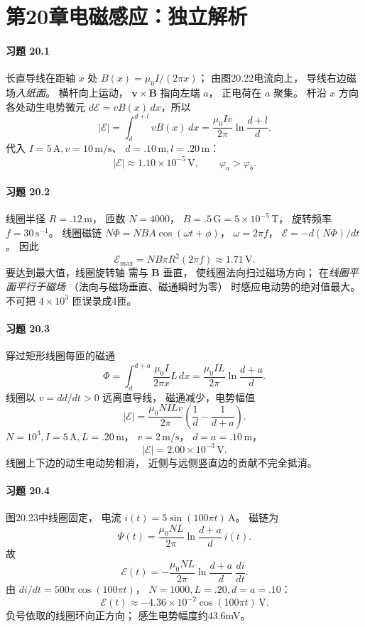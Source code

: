 \section*{第20章\quad 电磁感应：独立解析}

\paragraph{习题 20.1}
长直导线在距轴 \(x\) 处
\(B(x)=\mu_0I/(2\pi x)\)；
由图20.22电流向上，
导线右边磁场\emph{入纸面}。
横杆向上运动，
\(\boldsymbol v\times\boldsymbol B\) 指向左端 \(a\)，
正电荷在 \(a\) 聚集。
杆沿 \(x\) 方向各处动生电势微元
\(d\mathcal E=vB(x)\,dx\)，所以
\[
 \boxed{|\mathcal E|=\int_d^{d+l}vB(x)\,dx
 =\frac{\mu_0Iv}{2\pi}\ln\frac{d+l}{d}}.
\]
代入 \(I=5\,\mathrm A,v=10\,\mathrm{m/s}\)、
\(d=.10\,\mathrm m,l=.20\,\mathrm m\)：
\[
 \boxed{|\mathcal E|\approx1.10\times10^{-5}\,\mathrm V},
 \qquad \boxed{\varphi_a>\varphi_b}.
\]

\paragraph{习题 20.2}
线圈半径 \(R=.12\,\mathrm m\)，
匝数 \(N=4000\)，
\(B=.5\,\mathrm G=5\times10^{-5}\,\mathrm T\)，
旋转频率 \(f=30\,\mathrm{s^{-1}}\)。
线圈磁链 \(N\Phi=NBA\cos(\omega t+\phi)\)，
\(\omega=2\pi f\)，
\(\mathcal E=-d(N\Phi)/dt\)。
因此
\[
 \boxed{\mathcal E_{\max}=NB\pi R^2(2\pi f)
 \approx1.71\,\mathrm V}.
\]
要达到最大值，线圈旋转轴
需与 \(\boldsymbol B\) 垂直，
使线圈法向扫过磁场方向；
在\emph{线圈平面平行于磁场}
（法向与磁场垂直、磁通瞬时为零）
时感应电动势的绝对值最大。
不可把 \(4\times10^3\) 匝误录成4匝。

\paragraph{习题 20.3}
穿过矩形线圈每匝的磁通
\[
 \Phi=\int_d^{d+a}\frac{\mu_0I}{2\pi x}L\,dx
 =\frac{\mu_0IL}{2\pi}\ln\frac{d+a}{d}.
\]
线圈以 \(v=dd/dt>0\) 远离直导线，
磁通减少，电势幅值
\[
 \boxed{|\mathcal E|
 =\frac{\mu_0NILv}{2\pi}
 \left(\frac1d-\frac1{d+a}\right)}.
\]
\(N=10^3,I=5\,\mathrm A,L=.20\,\mathrm m\)，
\(v=2\,\mathrm{m/s}\)，
\(d=a=.10\,\mathrm m\)，
\[
 \boxed{|\mathcal E|=2.00\times10^{-3}\,\mathrm V}.
\]
线圈上下边的动生电动势相消，
近侧与远侧竖直边的贡献不完全抵消。

\paragraph{习题 20.4}
图20.23中线圈固定，
电流
\(i(t)=5\sin(100\pi t)\,\mathrm A\)。
磁链为
\[
 \Psi(t)=\frac{\mu_0NL}{2\pi}
 \ln\frac{d+a}{d}\ i(t).
\]
故
\[
 \boxed{\mathcal E(t)
 =-\frac{\mu_0NL}{2\pi}
 \ln\frac{d+a}{d}\ \frac{di}{dt}}.
\]
由 \(di/dt=500\pi\cos(100\pi t)\)，
\(N=1000,L=.20,d=a=.10\)：
\[
 \boxed{\mathcal E(t)\approx
 -4.36\times10^{-2}\cos(100\pi t)\,\mathrm V}.
\]
负号依取的线圈环向正方向；
感生电势幅度约43.6mV。

